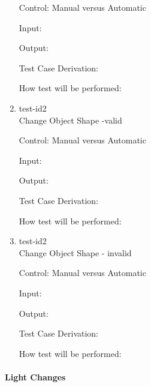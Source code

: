 \documentclass[12pt, titlepage]{article}
\begin{document}
\begin{enumerate}
	Control: Manual versus Automatic
	
	Input: 
	
	Output: 
	
	Test Case Derivation: 
	
	How test will be performed: 

	\item{test-id2\\}Change Object Shape -valid
	
	Control: Manual versus Automatic
	
	Input: 
	
	Output: 
	
	Test Case Derivation: 
	
	How test will be performed: 
	
	\item{test-id2\\}Change Object Shape - invalid
	
	Control: Manual versus Automatic
	
	Input: 
	
	Output: 
	
	Test Case Derivation: 
	
	How test will be performed: 	
		
\end{enumerate}

\paragraph{Light Changes}
\end{document}
